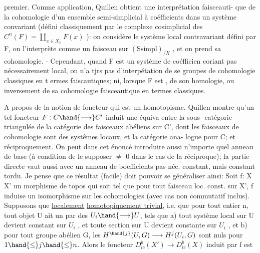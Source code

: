 premier.  Comme application, Quillen obtient une interprétation faisceauti-%
que de la cohomologie d'un ensemble semi-simplicial à coéfficients dans un
système  convariant  (défini classiquement par le complexe cosimplicial
 des  $C^n(F) = \coprod_{x\in X_n} F(x)$ ):  on considère le système local contravariant
défini par F, on l'interprète comme un faisceau sur  $(\mathrm{Ssimpl})_{/X}$ , et on
prend sa cohomologie. - Cependant, quand F est un système de coéfficien
coriant pas nécessairement local, on n'a tjrs pas d'interpétation de se
groupes de cohomologie  classiques en t ermes faiscautiques; ni, lorsque F
est , de son homologie, ou inversement de sa cohomologie
faisceautique en termes classiques.

A propos de la notion de foncteur qui est un homotopisme. Quillen
montre qu'un tel foncteur $F: C \hand{\longrightarrow} C'$ induit une équiva entre la sous-%
catégorie triangulée  de la catégorie  des faisceaux abéliens  sur C', dont
les faisceaux de cohomologie sont des systêmes locaux, et la catégorie ana-%
logue pour C;   et réciproquement.  On peut
dans cet énoncé introduire aussi n'importe quel anneau de base (à condition
de le supposer $\neq$ 0 dans le cas de la réciproque);  la partie directe
vaut aussi avec un anneau de boefficients pas néc. constant, mais constant
tordu.  Je pense que ce résultat (facile) doit pouvoir se généraliser ainsi:
Soit  f: X \quad X' un morphisme de topos qui  soit tel que pour tout 
faisceau loc. const. sur X', f induise un isomorphisme sur les cohomologies
(avec cas non commutatif inclus).  Supposons que   \uline{localement}
\margin{\unsure{$\circ$}} \margin{$\|$} \uline{homotopiquement trivial}, i.e. que  pour tout entier n, tout objet U 
 ait un   par des $U_i \hand{\longrightarrow} U$, tels que  a) tout système local sur U
devient constant sur $U_i$ , et toute section sur U devient constante sur $U_i$ ,
et  b)  pour tout   groupe abélien G, les $H^{\hand{j}}(U,G) \longrightarrow H^j(U_i,G)$ sont
nuls pour $1 \hand{\leq} j \hand{\leq} n$.  Alors le foncteur $D^b_{lc}(X') \longrightarrow D^b_{lc}(X)$  induit par f est


